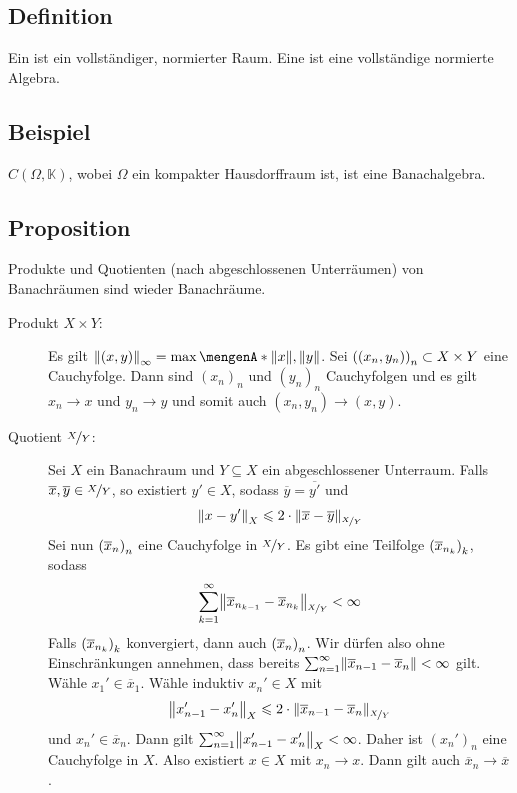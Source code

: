 \subsection[Definition: Banachraum und Banachalgebra]{Definition} %
\label{sub:214}
Ein  ist ein vollständiger, normierter Raum. Eine  ist eine vollständige normierte Algebra.  

\subsection[Beispiel für eine Banachalgebra]{Beispiel} %
\label{sub:215}
$C(\Omega, \mathds{K} )$, wobei $\Omega$ ein kompakter Hausdorffraum ist, ist eine Banachalgebra.

\subsection[Proposition: Produkte und Quotienten von Banachräumen]{Proposition} %
\label{sub:216}
Produkte und Quotienten (nach abgeschlossenen Unterräumen) von Banachräumen sind wieder Banachräume.
\begin{description}
	\item[Produkt $X \times Y$:] Es gilt $\norm[\infty]{(x,y)} = \max \set{\norm{x}, \norm{y}}$. Sei $\enbrace*{(x_n, y_n)}_n \subset X \times Y$ eine Cauchyfolge.
	Dann sind $(x_n)_n$ und $(y_n)_n$ Cauchyfolgen und es gilt $x_n \to x$ und $y_n \to y$ und somit auch $(x_n, y_n) \to (x,y)$.
	\item[Quotient $\nicefrac{X}{Y}$:] Sei $X$ ein Banachraum und $Y \subseteq X$ ein abgeschlossener Unterraum. 	
	Falls $\overline{x}, \overline{y} \in \nicefrac{X}{Y}$, so existiert $y' \in X$, sodass $\overline{y} = \overline{y'}$ und 
	\[
		\norm[X]{x-y'} \le 2 \cdot \norm[\nicefrac{X}{Y}]{\overline{x} - \overline{y}}  
	\] 
	Sei nun $\enbrace*{\overline{x}_n }_n$ eine Cauchyfolge in $\nicefrac{X}{Y}$. Es gibt eine Teilfolge $\enbrace*{\overline{x}_{n_k}}_k$, sodass
	\[
		\sum_{k=1}^{\infty} \norm[\nicefrac{X}{Y}]{\overline{x}_{n_{k-1}} - \overline{x}_{n_k}} < \infty 
	\]
	Falls $\enbrace*{\overline{x}_{n_k} }_k $ konvergiert, dann auch $\enbrace*{\overline{x}_n}_n$. Wir dürfen also ohne Einschränkungen annehmen, dass bereits 
	$\sum_{n=1}^{\infty} \norm{\overline{x}_{n-1} - \overline{x}_n }< \infty$ gilt. Wähle $x_1' \in \overline{x}_1$. Wähle induktiv $x_n' \in X$  mit
	\[
		\norm[X]{x_{n-1}' - x_n'} \le 2 \cdot \norm[\nicefrac{X}{Y}]{\overline{x}_{n-1} - \overline{x}_n}  
	\]
	und $x_n' \in \overline{x}_n$. Dann gilt $\sum_{n=1}^{\infty} \norm[X]{x_{n-1}' - x_n'} < \infty $. Daher ist $(x_n')_n$ eine Cauchyfolge in $X$. Also existiert 
	$x \in X$ mit $x_n \to x$. Dann gilt auch $\overline{x}_n  \to \overline{x}$. \bewende
\end{description}

